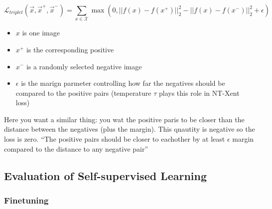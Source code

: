 \documentclass[11pt]{article}
\begin{document}
\begin{equation}
    \mathcal L_{triplet}(\vec x, \vec x^+, \vec x^-)=\sum_{x\in \mathcal X}\max(0, ||f(x)-f(x^+)||^2_2 - ||f(x)-f(x^-)||^2_2+\epsilon)
\end{equation}

\begin{itemize}
    \item $x$ is one image
    \item $x^+$ is the corresponding positive
    \item $x^-$ is a randomly selected negative image
    \item $\epsilon$ is the marign parmeter controlling how far the negatives should be compared to the positive pairs (temperature $\tau$ plays this role in NT-Xent loss)
\end{itemize}

Here you want a similar thing: you wat the positive paris to be closer than the distance between the negatives (plus the margin). This qnautity is negative so the loss is zero. ``The positive pairs should be closer to eachother by at least $\epsilon$ margin compared to the distance to any negative pair''

\subsection{Evaluation of Self-supervised Learning}

\subsubsection{Finetuning}

\begin{figure}[H]
    \centering
    \caption*{}
\end{figure}
\end{document}
